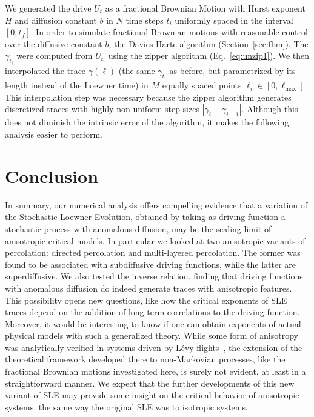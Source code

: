 We generated the drive $U_t$ as a fractional Brownian Motion with Hurst
exponent $H$ and diffusion constant $b$ in $N$ time steps $t_i$ uniformly
spaced in the interval $[0, t_f]$. In order to simulate fractional Brownian
motions with reasonable control over the diffusive constant $b$, the
Davies-Harte algorithm (Section~\ref{sec:fbm}). The $\gamma_{t_i}$ were
computed from $U_{t_i}$ using the zipper algorithm (Eq.~\ref{eq:unzip1}). We
then interpolated the trace $\gamma(\ell)$ (the same $\gamma_{t_i}$ as before,
but parametrized by its length instead of the Loewner time) in $M$ equally
spaced points $\ell_i\in[0,\ell_{\max}]$. This interpolation step was necessary
because the zipper algorithm generates discretized traces with highly
non-uniform step sizes $|\gamma_i-\gamma_{i-1}|$. Although this does not
diminish the intrinsic error of the algorithm, it makes the following analysis
easier to perform.


\section{Conclusion}
\label{sec:concl}

In summary, our numerical analysis offers compelling evidence that a variation
of the Stochastic Loewner Evolution, obtained by taking as driving function a
stochastic process with anomalous diffusion, may be the scaling limit of
anisotropic critical models. In particular we looked at two anisotropic
variants of percolation: directed percolation and multi-layered percolation.
The former was found to be associated with subdiffusive driving functions,
while the latter are superdiffusive. We also tested the inverse relation,
finding that driving functions with anomalous diffusion do indeed generate
traces with anisotropic features.  This possibility opens new questions, like
how the critical exponents of SLE traces depend on the addition of long-term
correlations to the driving function. Moreover, it would be interesting to know
if one can obtain exponents of actual physical models with such a generalized
theory. While some form of anisotropy was analytically verified in systems
driven by L\'evy flights~\cite{Oikonomou2008}, the extension of the theoretical
framework developed there to non-Markovian processes, like the fractional
Brownian motions investigated here, is surely not evident, at least in a
straightforward manner. We expect that the further developments of this new
variant of SLE may provide some insight on the critical behavior of anisotropic
systems, the same way the original SLE was to isotropic systems.



